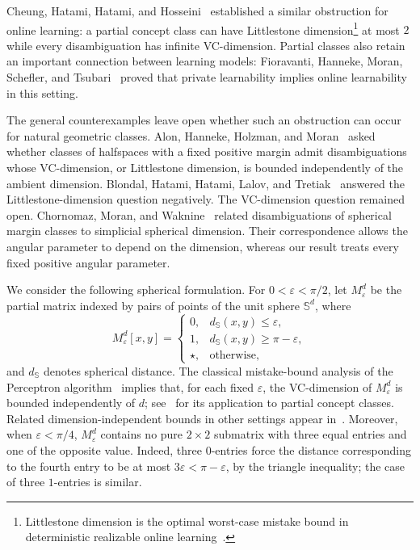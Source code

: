 \documentclass[11pt]{article}
\theoremstyle{remark}
\begin{document}
Cheung, Hatami, Hatami, and Hosseini~\cite{CHHH23} established a similar obstruction for online learning: a partial concept class can have Littlestone dimension\footnote{Littlestone dimension is the optimal worst-case mistake bound in deterministic realizable online learning~\cite{AHHM22}.} at most $2$ while every disambiguation has infinite VC-dimension.
Partial classes also retain an important connection between learning models: Fioravanti, Hanneke, Moran, Schefler, and Tsubari~\cite{FHMST24} proved that private learnability implies online learnability in this setting.

The general counterexamples leave open whether such an obstruction can occur for natural geometric classes.
Alon, Hanneke, Holzman, and Moran~\cite{AHHM22} asked whether classes of halfspaces with a fixed positive margin admit disambiguations whose VC-dimension, or Littlestone dimension, is bounded independently of the ambient dimension.
Blondal, Hatami, Hatami, Lalov, and Tretiak~\cite{BHHLT26} answered the Littlestone-dimension question negatively.
The VC-dimension question remained open.
Chornomaz, Moran, and Waknine~\cite{CMW25} related disambiguations of spherical margin classes to simplicial spherical dimension. 
Their correspondence allows the angular parameter to depend on the dimension, whereas our result treats every fixed positive angular parameter.

We consider the following spherical formulation.
For $0<\varepsilon<\pi/2$, let $M_\varepsilon^d$ be the partial matrix indexed by pairs of points of the unit sphere $\mathbb S^d$, where
\[
M_\varepsilon^d[x,y]=
\begin{cases}
0, & d_{\mathbb S}(x,y)\leq\varepsilon,\\
1, & d_{\mathbb S}(x,y)\geq\pi-\varepsilon,\\
\star, & \text{otherwise},
\end{cases}
\]
and $d_{\mathbb S}$ denotes spherical distance.
The classical mistake-bound analysis of the Perceptron algorithm~\cite{Rosenblatt58,Novikoff63} implies that, for each fixed $\varepsilon$, the VC-dimension of $M_\varepsilon^d$ is bounded independently of $d$; see~\cite{AHHM22} for its application to partial concept classes.
Related dimension-independent bounds in other settings appear in~\cite{BCT25,IJN26}.
Moreover, when $\varepsilon<\pi/4$, $M_\varepsilon^d$ contains no pure $2\times2$ submatrix with three equal entries and one of the opposite value.
Indeed, three $0$-entries force the distance corresponding to the fourth entry to be at most $3\varepsilon<\pi-\varepsilon$, by the triangle inequality; the case of three $1$-entries is similar.
\end{document}
